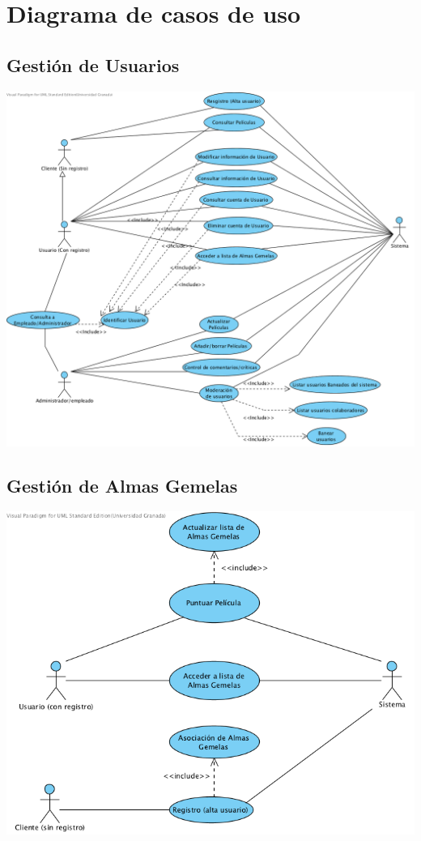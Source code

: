 \documentclass{article}
\begin{document}
\pagebreak
\section{Diagrama de casos de uso}
\subsection*{Gestión de Usuarios}
		\begin{center}
   			\includegraphics[scale=0.65]{GestiondeUsuarios.png}
   		\end{center}	
   		
\subsection*{Gestión de Almas Gemelas}
		\begin{center}
		
   			\includegraphics[scale=0.65]{GestiondeAlmasGemelas.png}
   		\end{center}	
\end{document}

